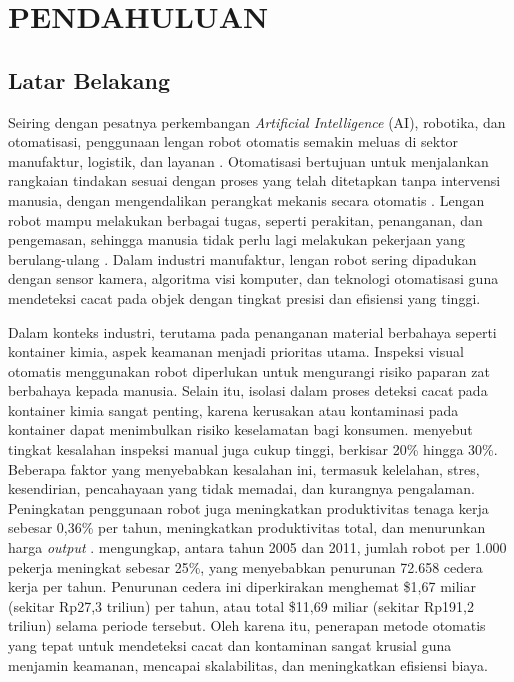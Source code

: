 \chapter{PENDAHULUAN}
\section{Latar Belakang}
Seiring dengan pesatnya perkembangan \textit{Artificial Intelligence} (AI),
robotika, dan otomatisasi, penggunaan lengan robot otomatis semakin
meluas di sektor manufaktur, logistik, dan layanan \citep{1}. Otomatisasi
bertujuan untuk menjalankan rangkaian tindakan sesuai dengan proses
yang telah ditetapkan tanpa intervensi manusia, dengan mengendalikan
perangkat mekanis secara otomatis \citep{2}. Lengan robot mampu melakukan
berbagai tugas, seperti perakitan, penanganan, dan pengemasan,
sehingga manusia tidak perlu lagi melakukan pekerjaan yang
berulang-ulang \citep{3}. Dalam industri manufaktur, lengan robot sering
dipadukan dengan sensor kamera, algoritma visi komputer, dan
teknologi otomatisasi guna mendeteksi cacat pada objek dengan tingkat
presisi dan efisiensi yang tinggi. \par

Dalam konteks industri, terutama pada penanganan material berbahaya
seperti kontainer kimia, aspek keamanan menjadi prioritas utama.
Inspeksi visual otomatis menggunakan robot diperlukan untuk
mengurangi risiko paparan zat berbahaya kepada manusia. Selain itu,
isolasi dalam proses deteksi cacat pada kontainer kimia sangat
penting, karena kerusakan atau kontaminasi pada kontainer dapat
menimbulkan risiko keselamatan bagi konsumen. \citet{4} menyebut
tingkat kesalahan
inspeksi manual juga cukup tinggi, berkisar 20\% hingga 30\%.
Beberapa faktor yang menyebabkan kesalahan ini, termasuk kelelahan,
stres, kesendirian, pencahayaan yang tidak memadai, dan kurangnya
pengalaman. Peningkatan penggunaan robot juga meningkatkan
produktivitas tenaga kerja sebesar 0,36\% per tahun, meningkatkan
produktivitas total, dan menurunkan harga \textit{output} \citep{5}. \citet{7}
mengungkap, antara tahun 2005 dan 2011, jumlah robot per 1.000
pekerja meningkat sebesar 25\%, yang menyebabkan penurunan 72.658
cedera kerja per tahun. Penurunan cedera ini diperkirakan menghemat
\$1,67 miliar (sekitar Rp27,3 triliun) per tahun, atau total \$11,69
miliar (sekitar Rp191,2 triliun) selama periode tersebut. Oleh
karena itu, penerapan metode otomatis yang tepat untuk mendeteksi
cacat dan kontaminan sangat krusial guna menjamin keamanan, mencapai
skalabilitas, dan meningkatkan efisiensi biaya.


